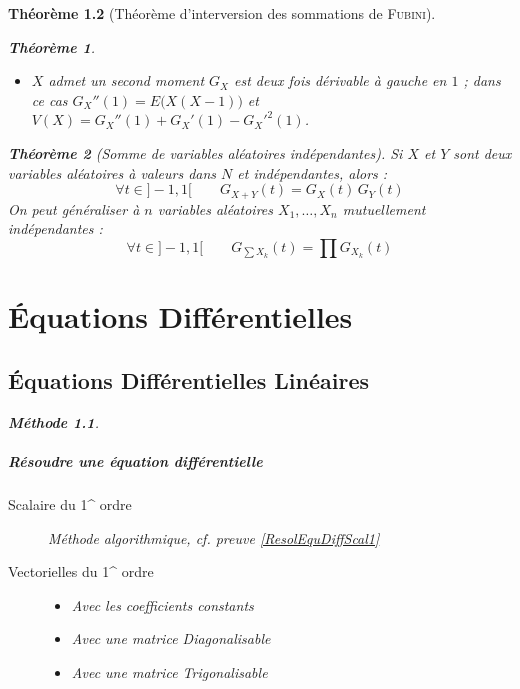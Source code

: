 \documentclass[11pt,a4paper]{report}
\newtheorem{theorem}{Théorème}[chapter]
\newtheorem{itheorem}[theorem]{Théorème}
\theoremstyle{definition}
\newtheorem{methode}[theorem]{Méthode}
\begin{document}
\begin{theorem}[Théorème d'interversion des sommations de \textsc{Fubini}]
{{\begin{itheorem}
\begin{itemize}[leftmargin=5.5mm]
         \item $X$ admet un second moment \Longleftrightarrow $G_X$ est deux fois dérivable à gauche en $1$ ; dans ce cas $G_X''(1) = E\big( X(X-1) \big)$ et $V(X) = G_X''(1) + G_X'(1) - G_X'^2(1)$.
     \end{itemize}
\end{itheorem}
\begin{itheorem}[Somme de variables aléatoires indépendantes]
     Si $X$ et $Y$ sont deux variables aléatoires à valeurs dans $N$ et indépendantes, alors :
     \begin{equation}
     \boxed{\forall t\in ]-1,1[}\qquad G_{X+Y}(t) = G_X(t)\, G_Y(t)
     \end{equation}
     On peut généraliser à $n$ variables aléatoires $X_1,\ldots ,X_n$ mutuellement indépendantes : 
     \begin{equation}
     \boxed{\forall t\in ]-1,1[}\qquad G_{\sum X_k}(t) = \prod G_{X_k}(t)
     \end{equation}
\end{itheorem}


\part{Équations Différentielles}
\chapter{Équations Différentielles Linéaires}
\begin{methode}
\subsubsection*{Résoudre une équation différentielle}
\begin{description}
    \item[Scalaire du 1^{} ordre]
                Méthode algorithmique, \textit{cf.} preuve \ref{ResolEquDiffScal1}
    \item[Vectorielles du 1^{} ordre] \hfill
    \begin{itemize}\itemsep2pt %
                    \item Avec les coefficients constants
                    \item Avec une matrice Diagonalisable
                    \item Avec une matrice Trigonalisable
    \end{itemize}


\end{description}
\end{methode}}}
\end{theorem}
\end{document}
